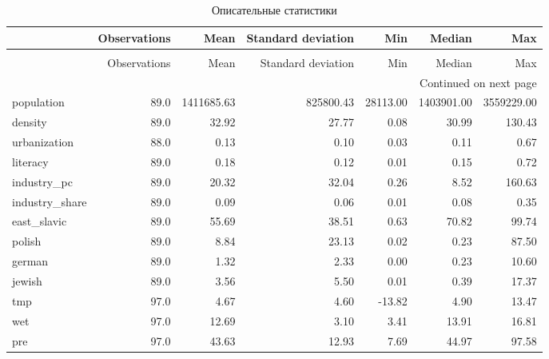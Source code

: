 \begin{longtable}{lrrrrrr}
\caption{Описательные статистики}
\label{table:sum}\\
\toprule
{} & Observations &        Mean & Standard deviation &       Min &      Median &         Max \\
\midrule
\endfirsthead
\caption[]{Описательные статистики} \\
\toprule
{} & Observations &        Mean & Standard deviation &       Min &      Median &         Max \\
\midrule
\endhead
\midrule
\multicolumn{7}{r}{{Continued on next page}} \\
\midrule
\endfoot

\bottomrule
\endlastfoot
population     &         89.0 &  1411685.63 &          825800.43 &  28113.00 &  1403901.00 &  3559229.00 \\
density        &         89.0 &       32.92 &              27.77 &      0.08 &       30.99 &      130.43 \\
urbanization   &         88.0 &        0.13 &               0.10 &      0.03 &        0.11 &        0.67 \\
literacy       &         89.0 &        0.18 &               0.12 &      0.01 &        0.15 &        0.72 \\
industry\_pc    &         89.0 &       20.32 &              32.04 &      0.26 &        8.52 &      160.63 \\
industry\_share &         89.0 &        0.09 &               0.06 &      0.01 &        0.08 &        0.35 \\
east\_slavic    &         89.0 &       55.69 &              38.51 &      0.63 &       70.82 &       99.74 \\
polish         &         89.0 &        8.84 &              23.13 &      0.02 &        0.23 &       87.50 \\
german         &         89.0 &        1.32 &               2.33 &      0.00 &        0.23 &       10.60 \\
jewish         &         89.0 &        3.56 &               5.50 &      0.01 &        0.39 &       17.37 \\
tmp            &         97.0 &        4.67 &               4.60 &    -13.82 &        4.90 &       13.47 \\
wet            &         97.0 &       12.69 &               3.10 &      3.41 &       13.91 &       16.81 \\
pre            &         97.0 &       43.63 &              12.93 &      7.69 &       44.97 &       97.58 \\

\end{longtable}
